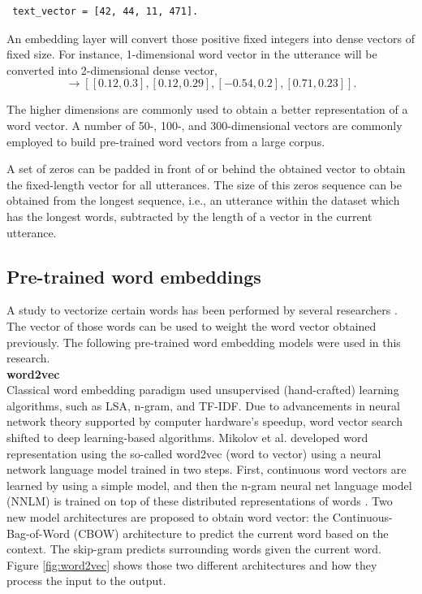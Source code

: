 \begin{verbatim}
 text_vector = [42, 44, 11, 471].
\end{verbatim}

An embedding layer will convert those positive fixed integers into dense
vectors of fixed size. For instance, 1-dimensional word vector in the utterance
will be converted into 2-dimensional dense vector,
\begin{equation*}
    [42, 44, 11, 471] \rightarrow  [[0.12, 0.3], [0.12, 0.29], [-0.54, 0.2], [0.71, 0.23]].
\end{equation*}

The higher dimensions are commonly used to obtain a better representation of a
word vector. A number of 50-, 100-, and 300-dimensional vectors are commonly
employed to build pre-trained word vectors from a large corpus.

A set of zeros can be padded in front of or behind the obtained vector to
obtain the fixed-length vector for all utterances. The size of this zeros
sequence can be obtained from the longest sequence, i.e., an utterance within
the dataset which has the longest words, subtracted by the length of a vector
in the current utterance.


\subsection{Pre-trained word embeddings}

A study to vectorize certain words has been performed by several researchers
\cite{Mikolov, Pennington2014, Mikolov2019}. The vector of those words can be
used to weight the word vector obtained previously. The following pre-trained
word embedding models were used in this research. \\

\noindent \textbf{word2vec} \\
Classical word embedding paradigm used unsupervised (hand-crafted) learning
algorithms, such as LSA, n-gram, and TF-IDF. Due to advancements in neural
network theory supported by computer hardware's speedup, word vector search
shifted to deep learning-based algorithms. Mikolov et al. \cite{Mikolov}
developed word representation using the so-called word2vec (word to vector)
using a neural network language model trained in two steps. First, continuous
word vectors are learned by using a simple model, and then the n-gram neural
net language model (NNLM) is trained on top of these distributed
representations of words \cite{Mikolov}. Two new model architectures are
proposed to obtain word vector: the Continuous-Bag-of-Word (CBOW) architecture
to predict the current word based on the context. The skip-gram predicts
surrounding words given the current word. Figure \ref{fig:word2vec} shows those
two different architectures and how they process the input to the output.


